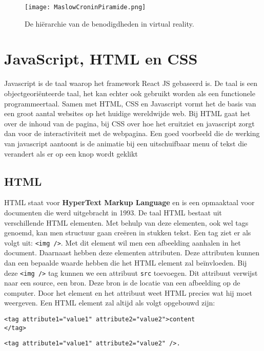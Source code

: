 \begin{figure}[h]
	\centering
	\texttt{[image: MaslowCroninPiramide.png]}
	\caption{De hiërarchie van de benodigdheden in virtual reality.}
	\label{fig:maslowcroninpiramide}
\end{figure}

\section{JavaScript, HTML en CSS}
\label{sec:frameworks}
Javascript is de taal waarop het framework React JS gebaseerd is. De taal is een objectgeoriënteerde taal, het kan echter ook gebruikt worden als een functionele programmeertaal. Samen met HTML, CSS en Javascript vormt het de basis van een groot aantal websites op het huidige wereldwijde web. Bij HTML gaat het over de inhoud van de pagina, bij CSS over hoe het eruitziet en javascript zorgt dan voor de interactiviteit met de webpagina. Een goed voorbeeld die de werking van javascript aantoont is de animatie bij een uitschuifbaar menu of tekst die verandert als er op een knop wordt geklikt

\subsection{HTML}
HTML staat voor \textbf{HyperText Markup Language} en is een opmaaktaal voor documenten die werd uitgebracht in 1993. De taal HTML bestaat uit verschillende HTML elementen. Met behulp van deze elementen, ook wel tags genoemd, kan men structuur gaan creëren in stukken tekst. Een tag ziet er als volgt uit: \lstinline[basicstyle=\ttfamily\color{red}]|<img />|. Met dit element wil men een afbeelding aanhalen in het document. Daarnaast hebben deze elementen attributen. Deze attributen kunnen dan een bepaalde waarde hebben die het HTML element zal beïnvloeden. Bij deze \lstinline[basicstyle=\ttfamily\color{red}]|<img />| tag kunnen we een attribuut \lstinline[basicstyle=\ttfamily\color{red}]|src| toevoegen. Dit attribuut verwijst naar een source, een bron. Deze bron is de locatie van een afbeelding op de computer. Door het element en het attribuut weet HTML precies wat hij moet weergeven. Een HTML element zal altijd als volgt opgebouwd zijn: 

\begin{lstlisting}[frame=single, caption=HTML Element voorbeeld 1]
<tag attribute1="value1" attribute2="value2">content
</tag>
\end{lstlisting}
\begin{lstlisting}[frame=single, caption=HTML Element voorbeeld 2]
<tag attribute1="value1" attribute2="value2" />.
\end{lstlisting}

